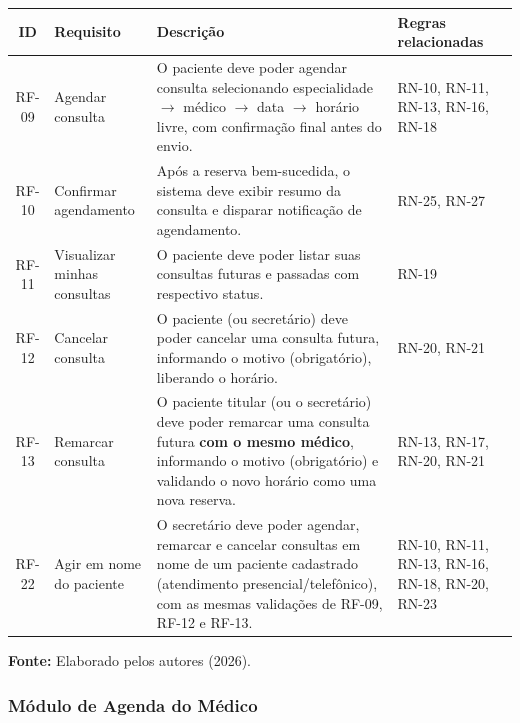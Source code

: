 \documentclass[12pt,a4paper]{article}
\newcommand{\fonte}[1]{%
  \par\vspace{2pt}%
  {\footnotesize\raggedright\textbf{Fonte:} #1\par}%
}
\begin{document}
\begin{table}[H]
\centering
{\footnotesize
\begin{tabularx}{\textwidth}{@{}c>{\raggedright\arraybackslash}p{2.9cm}>{\raggedright\arraybackslash}X>{\raggedright\arraybackslash}p{2.7cm}@{}}
\toprule
ID & Requisito & Descrição & Regras relacionadas \\
\midrule
RF-09 & Agendar consulta & O paciente deve poder agendar consulta selecionando especialidade $\rightarrow$ médico $\rightarrow$ data $\rightarrow$ horário livre, com confirmação final antes do envio. & RN-10, RN-11, RN-13, RN-16, RN-18 \\
RF-10 & Confirmar agendamento & Após a reserva bem-sucedida, o sistema deve exibir resumo da consulta e disparar notificação de agendamento. & RN-25, RN-27 \\
RF-11 & Visualizar minhas consultas & O paciente deve poder listar suas consultas futuras e passadas com respectivo status. & RN-19 \\
RF-12 & Cancelar consulta & O paciente (ou secretário) deve poder cancelar uma consulta futura, informando o motivo (obrigatório), liberando o horário. & RN-20, RN-21 \\
RF-13 & Remarcar consulta & O paciente titular (ou o secretário) deve poder remarcar uma consulta futura \textbf{com o mesmo médico}, informando o motivo (obrigatório) e validando o novo horário como uma nova reserva. & RN-13, RN-17, RN-20, RN-21 \\
RF-22 & Agir em nome do paciente & O secretário deve poder agendar, remarcar e cancelar consultas em nome de um paciente cadastrado (atendimento presencial/telefônico), com as mesmas validações de RF-09, RF-12 e RF-13. & RN-10, RN-11, RN-13, RN-16, RN-18, RN-20, RN-23 \\
\bottomrule
\end{tabularx}
}
\fonte{Elaborado pelos autores (2026).}
\end{table}

\subsubsection{Módulo de Agenda do Médico}
\end{document}
